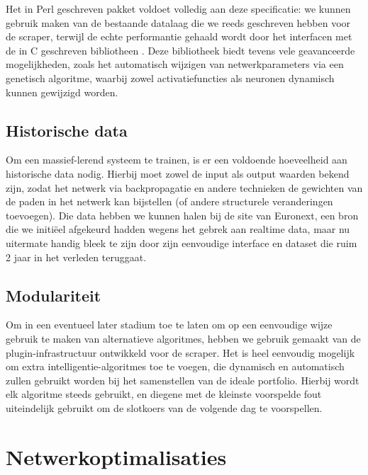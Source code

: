 Het in Perl geschreven  pakket voldoet volledig aan deze specificatie: we kunnen gebruik maken van de bestaande datalaag die we reeds geschreven hebben voor de scraper, terwijl de echte performantie gehaald wordt door het interfacen met de in C geschreven bibliotheen . Deze bibliotheek biedt tevens vele geavanceerde mogelijkheden, zoals het automatisch wijzigen van netwerkparameters via een genetisch algoritme, waarbij zowel activatiefuncties als neuronen dynamisch kunnen gewijzigd worden.


\section{Historische data}

Om een massief-lerend systeem te trainen, is er een voldoende hoeveelheid aan historische data nodig. Hierbij moet zowel de input als output waarden bekend zijn, zodat het netwerk via backpropagatie en andere technieken de gewichten van de paden in het netwerk kan bijstellen (of andere structurele veranderingen toevoegen). Die data hebben we kunnen halen bij de site van Euronext, een bron die we initi\"eel afgekeurd hadden wegens het gebrek aan realtime data, maar nu uitermate handig bleek te zijn door zijn eenvoudige interface en dataset die ruim 2 jaar in het verleden teruggaat.


\section{Modulariteit}

Om in een eventueel later stadium toe te laten om op een eenvoudige wijze gebruik te maken van alternatieve algoritmes, hebben we gebruik gemaakt van de plugin-infrastructuur ontwikkeld voor de scraper. Het is heel eenvoudig mogelijk om extra intelligentie-algoritmes toe te voegen, die dynamisch en automatisch zullen gebruikt worden bij het samenstellen van de ideale portfolio. Hierbij wordt elk algoritme steeds gebruikt, en diegene met de kleinste voorspelde fout uiteindelijk gebruikt om de slotkoers van de volgende dag te voorspellen.


%
%

\chapter{Netwerkoptimalisaties}


